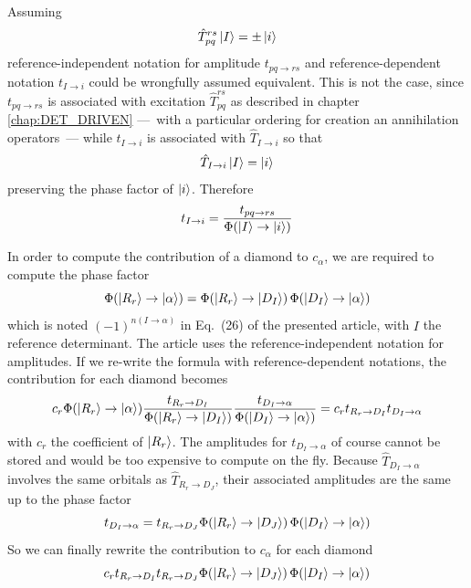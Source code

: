 \documentclass[./thesis.tex]{subfiles}
\begin{document}
Assuming
\begin{equation}
\hat T_{pq}^{rs} \ket I = \pm \ket i
\end{equation}
reference-independent notation for amplitude $t_{pq \rightarrow rs}$ and reference-dependent notation $t_{I \rightarrow i}$ could be wrongfully assumed equivalent. This is not the case, since $t_{pq \rightarrow rs}$ is associated with excitation $\hat T_{pq}^{rs}$ as described in chapter \ref{chap:DET_DRIVEN} ---~with a particular ordering for creation an annihilation operators~--- while $t_{I \rightarrow i}$ is associated with $\hat T_{I \rightarrow i}$ so that
\begin{equation}
\hat T_{I \rightarrow i}  \ket I = \ket i
\end{equation}
preserving the phase factor of $\ket i$. Therefore
\begin{equation}
t_{I \rightarrow i} = \frac{t_{pq \rightarrow rs}}{{\Phi \qty(\ket I \rightarrow \ket i)}}
\end{equation}

In order to compute the contribution of a diamond to $c_\alpha$, we are required to compute the phase factor
\begin{equation}
{\Phi \qty(\ket {R_r} \rightarrow {\ket{\alpha}})} = {\Phi \qty(\ket {R_r} \rightarrow \ket {D_I})}\, {\Phi \qty(\ket {D_I} \rightarrow {\ket{\alpha}})}
\end{equation}
which is noted $(-1)^{n(I \rightarrow \alpha)}$ in Eq.~(26) of the presented article, with $I$ the reference determinant. The article uses the reference-independent notation for amplitudes. If we re-write the formula with reference-dependent notations, the contribution for each diamond becomes
\begin{equation}
c_r {\Phi \qty(\ket {R_r} \rightarrow {\ket{\alpha}})} \frac{t_{R_r \rightarrow D_I}}{{\Phi \qty(\ket {R_r} \rightarrow \ket {D_I})}} \frac{t_{D_I \rightarrow \alpha}}{{\Phi \qty(\ket {D_I} \rightarrow {\ket{\alpha}})}} =c_r t_{R_r \rightarrow D_I} t_{D_I \rightarrow \alpha}
\end{equation}
with $c_r$ the coefficient of $\ket {R_r}$.
The amplitudes for $t_{D_I \rightarrow \alpha}$ of course cannot be stored and would be too expensive to compute on the fly. Because $\hat T_{D_I \rightarrow \alpha}$ involves the same orbitals as $\hat T_{R_r \rightarrow D_J}$, their associated amplitudes are the same up to the phase factor
\begin{equation}
t_{D_I \rightarrow \alpha} = t_{R_r \rightarrow D_J} {\Phi \qty(\ket {R_r} \rightarrow \ket {D_J})} \, {\Phi \qty(\ket {D_I} \rightarrow {\ket{\alpha}})}
\end{equation}
So we can finally rewrite the contribution to $c_\alpha$ for each diamond
\begin{equation}
c_r t_{R_r \rightarrow D_I} t_{R_r \rightarrow D_J} {\Phi \qty(\ket {R_r} \rightarrow \ket {D_J})}\,{\Phi \qty(\ket {D_I} \rightarrow {\ket{\alpha}})}
\end{equation}
\end{document}
